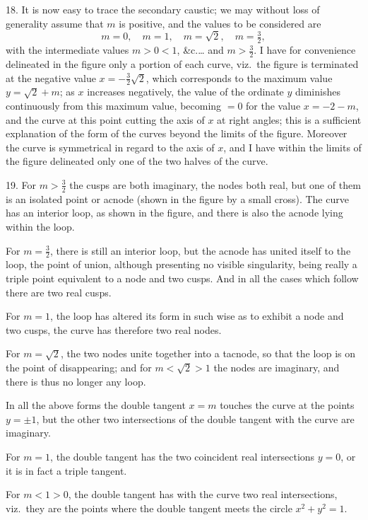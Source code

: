 \documentclass[11pt,a4paper]{article}
\theoremstyle{plain}
\begin{document}
18. It is now easy to trace the secondary caustic; we may without loss of generality assume that $m$ is positive, and the values to be considered are
\[
m = 0, \quad m = 1, \quad m = \sqrt{2}, \quad m = \tfrac32,
\]
with the intermediate values $m > 0 < 1$, \&c.\ldots{} and $m > \frac32$. I have for convenience delineated in the figure only a portion of each curve, viz.\ the figure is terminated at the negative value $x = -\frac32\sqrt{2}$, which corresponds to the maximum value $y = \sqrt{2} + m$; as $x$ increases negatively, the value of the ordinate $y$ diminishes continuously from this maximum value, becoming $= 0$ for the value $x = -2 - m$, and the curve at this point cutting the axis of $x$ at right angles; this is a sufficient explanation of the form of the curves beyond the limits of the figure. Moreover the curve is symmetrical in regard to the axis of $x$, and I have within the limits of the figure delineated only one of the two halves of the curve.

19. For $m > \frac32$ the cusps are both imaginary, the nodes both real, but one of them is an isolated point or acnode (shown in the figure by a small cross). The curve has an interior loop, as shown in the figure, and there is also the acnode lying within the loop.

For $m = \frac32$, there is still an interior loop, but the acnode has united itself to the loop, the point of union, although presenting no visible singularity, being really a triple point equivalent to a node and two cusps. And in all the cases which follow there are two real cusps.

For $m = 1$, the loop has altered its form in such wise as to exhibit a node and two cusps, the curve has therefore two real nodes.

For $m = \sqrt{2}$, the two nodes unite together into a tacnode, so that the loop is on the point of disappearing; and for $m < \sqrt{2} > 1$ the nodes are imaginary, and there is thus no longer any loop.

In all the above forms the double tangent $x = m$ touches the curve at the points $y = \pm 1$, but the other two intersections of the double tangent with the curve are imaginary.

For $m = 1$, the double tangent has the two coincident real intersections $y = 0$, or it is in fact a triple tangent.

For $m < 1 > 0$, the double tangent has with the curve two real intersections, viz.\ they are the points where the double tangent meets the circle $x^2 + y^2 = 1$.
\end{document}
